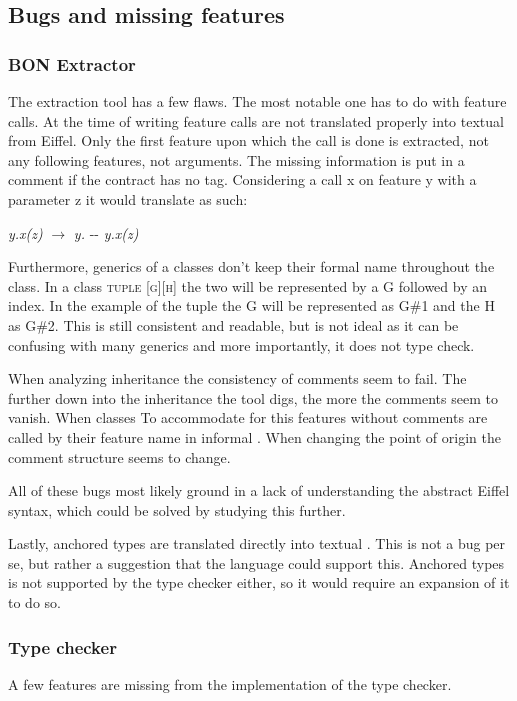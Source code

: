 \subsection{Bugs and missing features}
\subsubsection{BON Extractor}
The \bon{} extraction tool has a few flaws. The most notable one has to do with feature calls. At the time of writing feature calls are not translated properly into textual \bon{} from Eiffel. Only the first feature upon which the call is done is extracted, not any following features, not arguments. The missing information is put in a comment if the contract has no tag. Considering a call x on feature y with a parameter z it would translate as such:
\begin{center}
\textit{y.x(z)} $\rightarrow$ \textit{y.} -\-- \textit{y.x(z)}
\end{center}

Furthermore, generics of a classes don't keep their formal name throughout the class. In a class \textsc{tuple [g][h]} the two will be represented by a G followed by an index. In the example of the tuple the G will be represented as G\#1 and the H as G\#2. This is still consistent and readable, but is not ideal as it can be confusing with many generics and more importantly, it does not type check.

When analyzing inheritance the consistency of comments seem to fail. The further down into the inheritance the tool digs, the more the comments seem to vanish. When classes To accommodate for this features without comments are called by their feature name in informal \bon. When changing the point of origin the comment structure seems to change.

All of these bugs most likely ground in a lack of understanding the abstract Eiffel syntax, which could be solved by studying this further.

Lastly, anchored types are translated directly into textual \bon. This is not a bug per se, but rather a suggestion that the \bon{} language could support this. Anchored types is not supported by the type checker either, so it would require an expansion of it to do so.
\subsubsection{Type checker}
A few features are missing from the implementation of the type checker.

